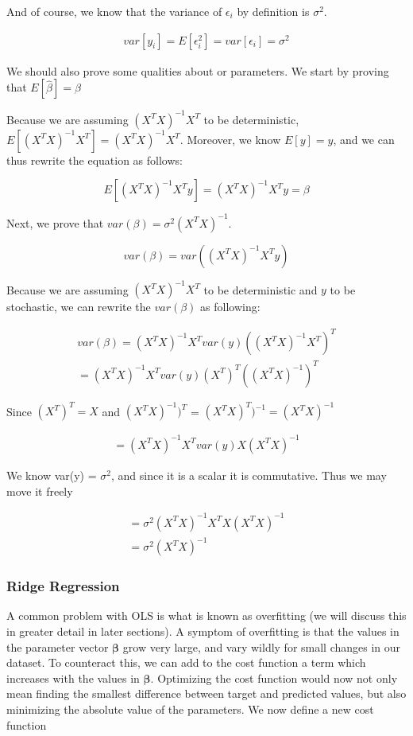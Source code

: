 \documentclass[twocolumn,10pt,cleanfoot]{asme2ej}
\begin{document}
And of course, we know that the variance of $\epsilon_i$ by definition is $\sigma^2$.

\begin{gather}
var[y_i] = E[\epsilon_i^2] = var[\epsilon_i] = \sigma^2 
\end{gather}

We should also prove some qualities about or parameters. We start by proving that $E[\hat{\beta}] = \beta$

Because we are assuming $(X^{T}X)^{-1}X^{T}$ to be deterministic, $E[(X^{T}X)^{-1}X^{T}] = (X^{T}X)^{-1}X^{T}$. Moreover, we know $E[y] = y$, and we can thus rewrite the equation as follows:

\begin{equation}
E[(X^{T}X)^{-1}X^{T}y] = (X^{T}X)^{-1}X^{T}y = \beta
\end{equation}

Next, we prove that $var(\beta) = \sigma^{2}(X^{T}X)^{-1}$.

$$var(\beta) = var((X^{T}X)^{-1}X^{T}y)$$

Because we are assuming $(X^{T}X)^{-1}X^{T}$ to be deterministic and $y$ to be stochastic, we can rewrite the $var(\beta)$ as following:

\begin{gather}
var(\beta) = (X^{T}X)^{-1}X^{T}var(y)((X^{T}X)^{-1}X^{T})^{T} \\
= (X^{T}X)^{-1}X^{T}var(y)(X^{T})^{T}((X^{T}X)^{-1})^{T}
\end{gather}

Since $(X^{T})^{T} = X$ and $(X^{T}X)^{-1})^{T}$ = $(X^{T}X)^{T})^{-1} = (X^{T}X)^{-1}$

\begin{gather}
= (X^{T}X)^{-1}X^{T}var(y)X(X^{T}X)^{-1}
\end{gather}

We know var(y) = $\sigma^{2}$, and since it is a scalar it is commutative. Thus we may move it freely

\begin{gather}
= \sigma^{2}(X^{T}X)^{-1}X^{T}X(X^{T}X)^{-1} \\
= \sigma^{2}(X^{T}X)^{-1}
\end{gather}

\subsubsection{Ridge Regression}

A common problem with OLS is what is known as overfitting (we will discuss this in greater detail in later sections). A symptom of overfitting is that the values in the parameter vector $\bm{\beta}$ grow very large, and vary wildly for small changes in our dataset. To counteract this, we can add to the cost function a term which increases with the values in $\bm{\beta}$. Optimizing the cost function would now not only mean finding the smallest difference between target and predicted values, but also minimizing the absolute value of the parameters. We now define a new cost function
\end{document}
